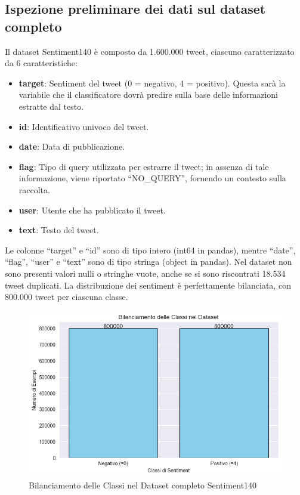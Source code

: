 \documentclass[12pt,a4paper]{report} %
\begin{document}
\subsection{Ispezione preliminare dei dati sul dataset completo}
Il dataset Sentiment140 è composto da 1.600.000 tweet, ciascuno caratterizzato da 6 caratteristiche:
\begin{itemize}
    \item \textbf{target}: Sentiment del tweet (0 = negativo, 4 = positivo). Questa sarà la variabile che il classificatore dovrà predire sulla base delle informazioni estratte dal testo. 
    \item \textbf{id}: Identificativo univoco del tweet.
    \item \textbf{date}: Data di pubblicazione.
    \item \textbf{flag}: Tipo di query utilizzata per estrarre il tweet; in assenza di tale informazione, viene riportato “NO\_QUERY”, fornendo un contesto sulla raccolta.
    \item \textbf{user}: Utente che ha pubblicato il tweet.
    \item \textbf{text}: Testo del tweet.
\end{itemize}
Le colonne “target” e “id” sono di tipo intero (int64 in pandas), mentre “date”, “flag”, “user” e “text” sono di tipo stringa (object in pandas). Nel dataset non sono presenti valori nulli o stringhe vuote, anche se si sono riscontrati 18.534 tweet duplicati. La distribuzione dei sentiment è perfettamente bilanciata, con 800.000 tweet per ciascuna classe.

 
\begin{figure}[H]
    \centering
    \includegraphics[width=0.75\linewidth]{immagini/bilanciamento_sentiment140_raw.png}
    \caption{Bilanciamento delle Classi nel Dataset completo Sentiment140}
    \label{fig:enter-label}
\end{figure}
\end{document}
